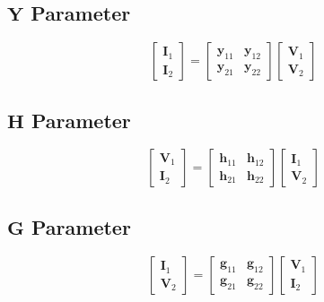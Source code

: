 	\subsection*{$\mathbf{Y}$ Parameter} \label{subsec:Y Parameter}
		\begin{equation*} \label{eq:Y Parameter}
			\begin{bmatrix}
				\mathbf{I}_{1} \\
				\mathbf{I}_{2} 
			\end{bmatrix}
			=\begin{bmatrix}
				\mathbf{y}_{11} & \mathbf{y}_{12} \\
				\mathbf{y}_{21} & \mathbf{y}_{22}
			\end{bmatrix}
			\begin{bmatrix}
				\mathbf{V}_{1} \\
				\mathbf{V}_{2} 
			\end{bmatrix}
		\end{equation*}
	
	\vspace{-4mm}	
	\subsection*{$\mathbf{H}$ Parameter} \label{subsec:H Parameter}
		\begin{equation*} \label{eq:H Parameter}
			\begin{bmatrix}
				\mathbf{V}_{1} \\
				\mathbf{I}_{2} 
			\end{bmatrix}
			=\begin{bmatrix}
				\mathbf{h}_{11} & \mathbf{h}_{12} \\
				\mathbf{h}_{21} & \mathbf{h}_{22}
			\end{bmatrix}
			\begin{bmatrix}
				\mathbf{I}_{1} \\
				\mathbf{V}_{2} 
			\end{bmatrix}
		\end{equation*}

	\vspace{-4mm}
	\subsection*{$\mathbf{G}$ Parameter} \label{subsec:G Parameter}
		\begin{equation*} \label{eq:G Parameter}
			\begin{bmatrix}
				\mathbf{I}_{1} \\
				\mathbf{V}_{2} 
			\end{bmatrix}
			=\begin{bmatrix}
				\mathbf{g}_{11} & \mathbf{g}_{12} \\
				\mathbf{g}_{21} & \mathbf{g}_{22}
			\end{bmatrix}
			\begin{bmatrix}
				\mathbf{V}_{1} \\
				\mathbf{I}_{2} 
			\end{bmatrix}
		\end{equation*}
	
